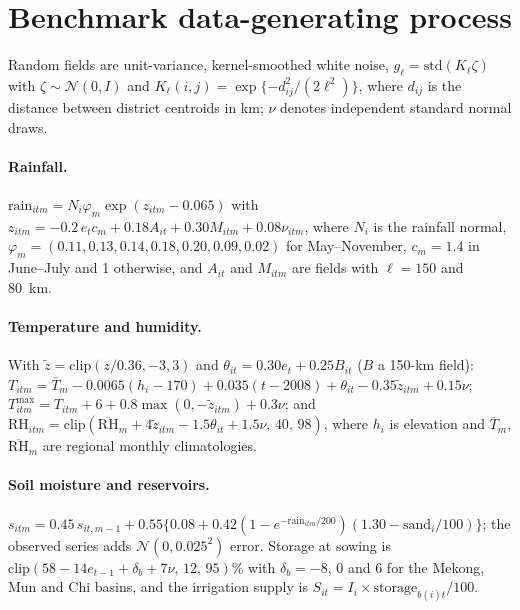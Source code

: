 \section{Benchmark data-generating process}\label{app:dgp}
Random fields are unit-variance, kernel-smoothed white noise, $g_\ell=\mathrm{std}(K_\ell\zeta)$ with $\zeta\sim\mathcal N(0,I)$ and $K_\ell(i,j)=\exp\{-d_{ij}^2/(2\ell^2)\}$, where $d_{ij}$ is the distance between district centroids in km; $\nu$ denotes independent standard normal draws.

\paragraph{Rainfall.} $\mathrm{rain}_{itm}=N_i\varphi_m\exp(z_{itm}-0.065)$ with $z_{itm}=-0.2\,e_t c_m+0.18A_{it}+0.30M_{itm}+0.08\nu_{itm}$, where $N_i$ is the rainfall normal, $\varphi_m=(0.11,\allowbreak 0.13,\allowbreak 0.14,\allowbreak 0.18,\allowbreak 0.20,\allowbreak 0.09,\allowbreak 0.02)$ for May--November, $c_m=1.4$ in June--July and 1 otherwise, and $A_{it}$ and $M_{itm}$ are fields with $\ell=150$ and 80~km.

\paragraph{Temperature and humidity.} With $\tilde z=\mathrm{clip}(z/0.36,-3,\allowbreak 3)$ and $\theta_{it}=0.30e_t+0.25B_{it}$ ($B$ a 150-km field): $T_{itm}=\bar T_m-0.0065(h_i-170)+0.035(t-2008)+\theta_{it}-0.35\tilde z_{itm}+0.15\nu$; $T^{\max}_{itm}=T_{itm}+6+0.8\max(0,-\tilde z_{itm})+0.3\nu$; and $\mathrm{RH}_{itm}=\mathrm{clip}(\overline{\mathrm{RH}}_m+4\tilde z_{itm}-1.5\theta_{it}+1.5\nu,\,40,\,98)$, where $h_i$ is elevation and $\bar T_m$, $\overline{\mathrm{RH}}_m$ are regional monthly climatologies.

\paragraph{Soil moisture and reservoirs.} $s_{itm}=0.45\,s_{it,m-1}+0.55\{0.08+0.42(1-e^{-\mathrm{rain}_{itm}/200})(1.30-\mathrm{sand}_i/100)\}$; the observed series adds $\mathcal N(0,\allowbreak 0.025^2)$ error. Storage at sowing is $\mathrm{clip}(58-14e_{t-1}+\delta_b+7\nu,\,12,\,95)$\% with $\delta_b=-8$, 0 and 6 for the Mekong, Mun and Chi basins, and the irrigation supply is $S_{it}=I_i\times\mathrm{storage}_{b(i)t}/100$.

